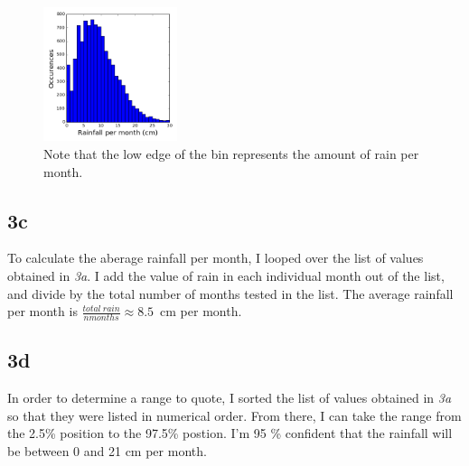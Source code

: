 \documentclass[twocolumn]{revtex4}
\begin{document}
\begin{figure}[h]
\centering

\caption{Note that the low edge of the bin represents the amount of rain per month.}

\includegraphics[width = 0.35\textwidth]{histogram.png}

\end{figure}

\subsection{3c}

To calculate the aberage rainfall per month, I looped over the list of values obtained in \textit{3a}.  I add the value of rain in each individual month out of the list, and divide by the total number of months tested in the list.  The average rainfall per month is $ \frac{total~ rain}{nmonths} \approx 8.5 $~cm per month.

\subsection{3d}

In order to determine a range to quote, I sorted the list of values obtained in \textit{3a} so that they were listed in numerical order.  From there, I can take the range from the 2.5\% position to the 97.5\% postion.  I'm 95 \% confident that the rainfall will be between 0 and 21 cm per month.


\end{document}
